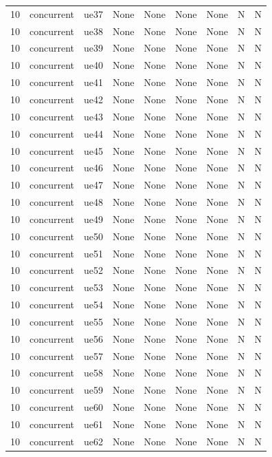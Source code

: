 \begin{table}[ht]
\begin{tabular}{|c|c|c|c|c|c|c|c|c|}
10 & concurrent & ue37 & None & None & None & None & N & N \\
10 & concurrent & ue38 & None & None & None & None & N & N \\
10 & concurrent & ue39 & None & None & None & None & N & N \\
10 & concurrent & ue40 & None & None & None & None & N & N \\
10 & concurrent & ue41 & None & None & None & None & N & N \\
10 & concurrent & ue42 & None & None & None & None & N & N \\
10 & concurrent & ue43 & None & None & None & None & N & N \\
10 & concurrent & ue44 & None & None & None & None & N & N \\
10 & concurrent & ue45 & None & None & None & None & N & N \\
10 & concurrent & ue46 & None & None & None & None & N & N \\
10 & concurrent & ue47 & None & None & None & None & N & N \\
10 & concurrent & ue48 & None & None & None & None & N & N \\
10 & concurrent & ue49 & None & None & None & None & N & N \\
10 & concurrent & ue50 & None & None & None & None & N & N \\
10 & concurrent & ue51 & None & None & None & None & N & N \\
10 & concurrent & ue52 & None & None & None & None & N & N \\
10 & concurrent & ue53 & None & None & None & None & N & N \\
10 & concurrent & ue54 & None & None & None & None & N & N \\
10 & concurrent & ue55 & None & None & None & None & N & N \\
10 & concurrent & ue56 & None & None & None & None & N & N \\
10 & concurrent & ue57 & None & None & None & None & N & N \\
10 & concurrent & ue58 & None & None & None & None & N & N \\
10 & concurrent & ue59 & None & None & None & None & N & N \\
10 & concurrent & ue60 & None & None & None & None & N & N \\
10 & concurrent & ue61 & None & None & None & None & N & N \\
10 & concurrent & ue62 & None & None & None & None & N & N \\

\end{tabular}
\end{table}
